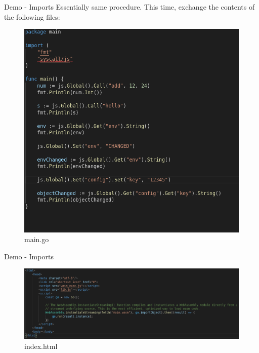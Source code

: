 \documentclass{beamer}
\begin{document}
\begin{frame}{Demo - Imports}
    Essentially same procedure. This time, exchange the contents of the following files:
    \begin{figure}
        \includegraphics[scale=0.2]{./images/maingo.png}
        \caption{main.go}
    \end{figure}

\end{frame}

\begin{frame}{Demo - Imports}
    \begin{figure}
        \includegraphics[scale=0.25]{./images/jsindex.png}
        \caption{index.html}
    \end{figure}

\end{frame}
\end{document}
